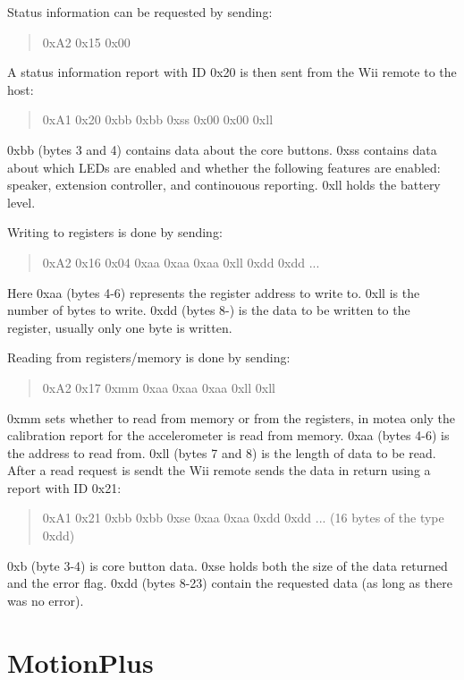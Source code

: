 Status information can be requested by sending:
\begin{quote}
0xA2 0x15 0x00
\end{quote}
A status information report with ID 0x20 is then sent from the Wii remote to the host:
\begin{quote}
0xA1 0x20 0xbb 0xbb 0xss 0x00 0x00 0xll
\end{quote}
0xbb (bytes 3 and 4) contains data about the core buttons. 0xss contains data about which LEDs are enabled and whether the following features are enabled: speaker, extension controller, and continouous reporting. 0xll holds the battery level. 

Writing to registers is done by sending:
\begin{quote}
0xA2 0x16 0x04 0xaa 0xaa 0xaa 0xll 0xdd 0xdd ...
\end{quote}
Here 0xaa (bytes 4-6) represents the register address to write to. 0xll is the number of bytes to write. 0xdd (bytes 8-) is the data to be written to the register, usually only one byte is written.

Reading from registers/memory is done by sending:
\begin{quote}
0xA2 0x17 0xmm 0xaa 0xaa 0xaa 0xll 0xll
\end{quote}
0xmm sets whether to read from memory or from the registers, in motea only the calibration report for the accelerometer is read from memory. 0xaa (bytes 4-6) is the address to read from. 0xll (bytes 7 and 8) is the length of data to be read. After a read request is sendt the Wii remote sends the data in return using a report with ID 0x21:
\begin{quote}
0xA1 0x21 0xbb 0xbb 0xse 0xaa 0xaa 0xdd 0xdd ... (16 bytes of the type 0xdd)
\end{quote}
0xb (byte 3-4) is core button data. 0xse holds both the size of the data returned and the error flag. 0xdd (bytes 8-23) contain the requested data (as long as there was no error).

\chapter{MotionPlus}
\label{app:gyroParse}

